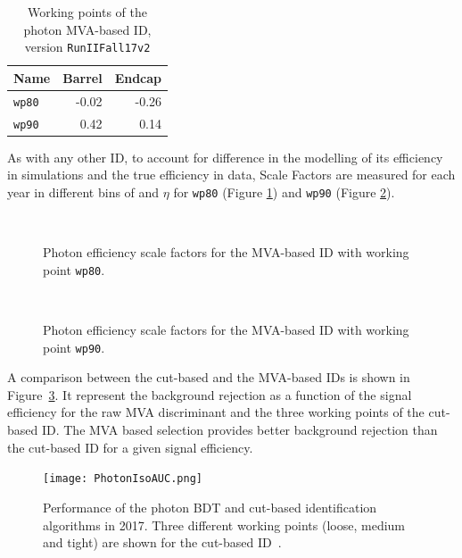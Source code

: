 \begin{table}[ht]
\caption[.]{Working points of the photon MVA-based ID, version \texttt{RunIIFall17v2}}
\label{tab:MVAwpCuts}
\centering
\begin{tabular}{lrr}
\toprule
Name & Barrel & Endcap \\
\midrule
\texttt{wp80} & -0.02 & -0.26 \\
\texttt{wp90} &  0.42 &  0.14 \\
\bottomrule
\end{tabular}
\end{table}

As with any other ID, to account for difference in the modelling of its efficiency in simulations and the true efficiency in data,
Scale Factors are measured for each year in different bins of \pt and $\eta$ for \texttt{wp80} (Figure \ref{fig:phEffMVASF_wp80}) and \texttt{wp90} (Figure \ref{fig:phEffMVASF_wp90}).

\begin{figure}
\centering
{}%
\\
\caption{Photon efficiency scale factors for the MVA-based ID with working point \texttt{wp80}.}
\label{fig:phEffMVASF_wp80}
\end{figure}

\begin{figure}
\centering
{}%
\\
\caption{Photon efficiency scale factors for the MVA-based ID with working point \texttt{wp90}.}
\label{fig:phEffMVASF_wp90}
\end{figure}

A comparison between the cut-based and the MVA-based IDs is shown in Figure~\ref{fig:PhotonIsoAUC}.
It represent the background rejection as a function of the signal efficiency for the raw MVA discriminant
and the three working points of the cut-based ID.
The MVA based selection provides better background rejection than the cut-based ID
for a given signal efficiency.

\begin{figure}
\centering
\texttt{[image: PhotonIsoAUC.png]}
\caption{Performance of the photon BDT and cut-based identification algorithms in 2017.
Three different working points (loose, medium and tight) are shown for the cut-based ID~\cite{CMS-EGM-14-001}.}
\label{fig:PhotonIsoAUC}
\end{figure}

